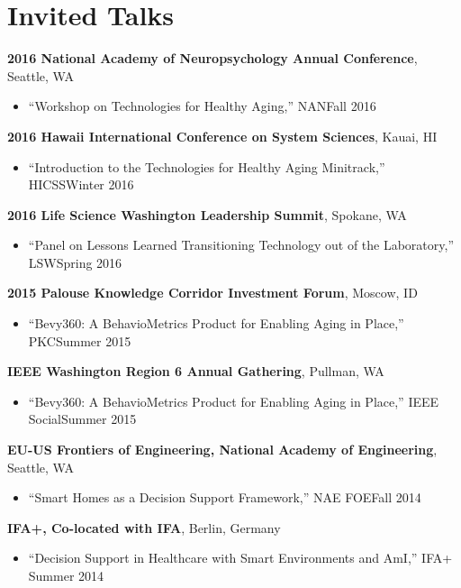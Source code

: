 \AOCLine
\section*{Invited Talks}
\label{sec:invitedtalks}

{\bf 2016 National Academy of Neuropsychology Annual Conference}, Seattle, WA
\begin{itemize}
  \item ``Workshop on Technologies for Healthy Aging,'' NAN\hfill Fall 2016
\end{itemize}

{\bf 2016 Hawaii International Conference on System Sciences}, Kauai, HI
\begin{itemize}
  \item ``Introduction to the Technologies for Healthy Aging Minitrack,'' HICSS\hfill Winter 2016
\end{itemize}

{\bf 2016 Life Science Washington Leadership Summit}, Spokane, WA
\begin{itemize}
  \item ``Panel on Lessons Learned Transitioning Technology out of the Laboratory,'' LSW\hfill Spring 2016
\end{itemize}

{\bf 2015 Palouse Knowledge Corridor Investment Forum}, Moscow, ID
\begin{itemize}
  \item ``Bevy360: A BehavioMetrics Product for Enabling Aging in Place,'' PKC\hfill Summer 2015
\end{itemize}

{\bf IEEE Washington Region 6 Annual Gathering}, Pullman, WA
\begin{itemize}
  \item ``Bevy360: A BehavioMetrics Product for Enabling Aging in Place,'' IEEE Social\hfill Summer 2015
\end{itemize}

{\bf EU-US Frontiers of Engineering, National Academy of Engineering}, Seattle, WA
\begin{itemize}
  \item ``Smart Homes as a Decision Support Framework,'' NAE FOE\hfill Fall 2014
\end{itemize}

{\bf IFA+, Co-located with IFA}, Berlin, Germany
\begin{itemize}
  \item ``Decision Support in Healthcare with Smart Environments and AmI,'' IFA+ \hfill Summer 2014
\end{itemize}

